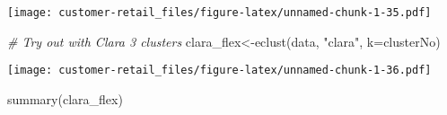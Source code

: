 \documentclass[
]{article}
\newenvironment{Shaded}{\begin{snugshade}}{\end{snugshade}}
\newcommand{\AttributeTok}[1]{\textcolor[rgb]{0.77,0.63,0.00}{#1}}
\newcommand{\CommentTok}[1]{\textcolor[rgb]{0.56,0.35,0.01}{\textit{#1}}}
\newcommand{\FunctionTok}[1]{\textcolor[rgb]{0.00,0.00,0.00}{#1}}
\newcommand{\NormalTok}[1]{#1}
\newcommand{\OtherTok}[1]{\textcolor[rgb]{0.56,0.35,0.01}{#1}}
\newcommand{\StringTok}[1]{\textcolor[rgb]{0.31,0.60,0.02}{#1}}
\begin{document}
\texttt{[image: customer-retail\_files/figure-latex/unnamed-chunk-1-35.pdf]}

\begin{Shaded}
\begin{Highlighting}[]
\CommentTok{\# Try out with Clara 3 clusters  }
\NormalTok{clara\_flex}\OtherTok{\textless{}{-}}\FunctionTok{eclust}\NormalTok{(data, }\StringTok{"clara"}\NormalTok{, }\AttributeTok{k=}\NormalTok{clusterNo) }
\end{Highlighting}
\end{Shaded}

\texttt{[image: customer-retail\_files/figure-latex/unnamed-chunk-1-36.pdf]}

\begin{Shaded}
\begin{Highlighting}[]
\FunctionTok{summary}\NormalTok{(clara\_flex)}
\end{Highlighting}
\end{Shaded}
\end{document}

